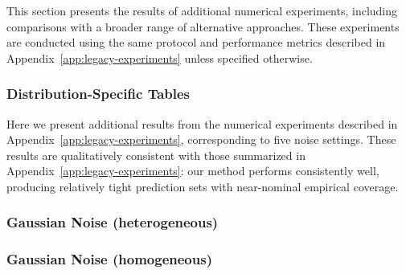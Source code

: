 This section presents the results of additional numerical experiments, including comparisons with a broader range of alternative approaches.
These experiments are conducted using the same protocol and performance metrics described in Appendix~\ref{app:legacy-experiments} unless specified otherwise. 

\subsubsection{Distribution-Specific Tables}
\label{app:simulations}

Here we present additional results from the numerical experiments described in Appendix~\ref{app:legacy-experiments}, corresponding to five noise settings. These results are qualitatively consistent with those summarized in Appendix~\ref{app:legacy-experiments}: our method performs consistently well, producing relatively tight prediction sets with near-nominal empirical coverage.

\subsubsection*{Gaussian Noise (heterogeneous)}

\begin{table}[H]
    \centering
    
    \caption{Performance of the proposed TSCP method and alternative conformal prediction approaches on simulated data with $d=10$ outcome variables, as in Figure~\ref{fig:gaussian-heter}. All results are averaged over $200$ trials with their one standard deviation reported in parenthesis.  
    The target coverage level is $0.9$. Coverage below this target is highlighted in \textcolor{red}{red}. For volume, lower is better. Smallest volume size (among those with valid theoretical coverage) is highlighted in \textbf{bold}. TSCP yields the tightest volume while maintaining valid coverage.}
    \label{tab:gaussian-heter}
\end{table}

\clearpage
\subsubsection*{Gaussian Noise (homogeneous)}

\begin{table}[H]
    \centering
    
    \caption{Performance of the proposed TSCP method and alternative conformal prediction approaches on simulated data with $d=10$ outcome variables, as in Figure~\ref{fig:gaussian-homo}. Other details are as in Table~\ref{tab:gaussian-heter}. In this case, Unscaled Max yields the tightest volume while maintaining valid coverage, while TSCP remains a competitive second. }
    \label{tab:gaussian-homo}
\end{table}


